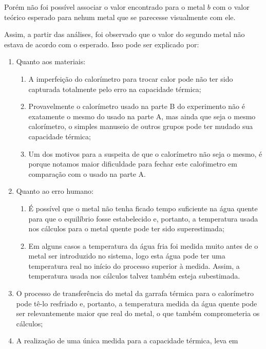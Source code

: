 \documentclass[a4paper]{article}
\begin{document}
				Porém não foi possível associar o valor encontrado para o metal $b$
				com o valor teórico esperado para nehum metal que se parecesse visualmente
				com ele.

				Assim, a partir das análises, foi observado que o valor do segundo metal não estava de acordo com o esperado. Isso pode ser explicado por: 

				\begin{enumerate}
					\item Quanto aos materiais: 
						\begin{enumerate}
							\item A imperfeição do calorímetro para trocar calor pode não ter sido capturada
							totalmente pelo erro na capacidade térmica; 
							\item Provavelmente o calorímetro usado na parte B do experimento não é
							exatamente o mesmo do usado na parte A, mas ainda que seja o mesmo
							calorímetro, o simples manuseio de outros grupos pode ter mudado sua
							capacidade térmica; 
							\item Um dos motivos para a suspeita de que o calorímetro não seja o mesmo,
							é porque notamos maior dificuldade para fechar este calo\'{r}imetro
							em comparação com o usado na parte A. 
						\end{enumerate}
					\item Quanto ao erro humano: 
						\begin{enumerate}
							\item É possível que o metal não tenha ficado tempo suficiente na água quente
							para que o equilíbrio fosse estabelecido e, portanto, a temperatura
							usada nos cálculos para o metal quente pode ter sido superestimada; 
							\item Em alguns casos a temperatura da água fria foi medida muito antes
							de o metal ser introduzido no sistema, logo esta água pode ter uma
							temperatura real no início do processo superior à medida. Assim, a
							temperatura usada nos cálculos talvez também esteja subestimada. 
						\end{enumerate}
					\item O processo de transferência do metal da garrafa térmica para o calorímetro
					pode tê-lo resfriado e, portanto, a temperatura medida da água quente
					pode ser relevantemente maior que real do metal, o que também comprometeria
					os cálculos; 
					\item A realização de uma única medida para a capacidade térmica, leva em

\end{enumerate}
\end{document}
